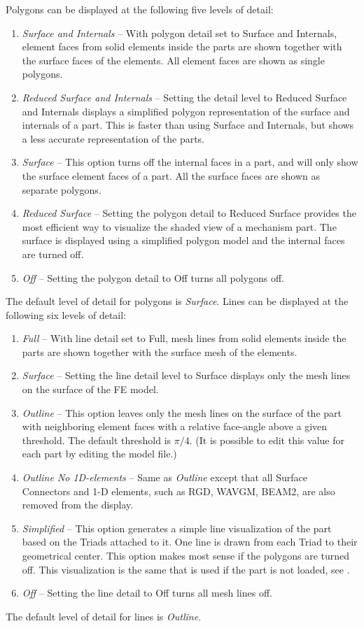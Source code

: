 Polygons can be displayed at the following five levels of detail:
%
\begin{enumerate}
\item{\sl Surface and Internals} --
  With polygon detail set to Surface and Internals,
  element faces from solid elements inside the parts are shown
  together with the surface faces of the elements.
  All element faces are shown as single polygons.
\item{\sl Reduced Surface and Internals} --
  Setting the detail level to Reduced Surface and Internals displays
  a simplified polygon representation of the surface and internals of a part.
  This is faster than using Surface and Internals,
  but shows a less accurate representation of the parts.
\item{\sl Surface} --
  This option turns off the internal faces in a part,
  and will only show the surface element faces of a part.
  All the surface faces are shown as separate polygons.
\item{\sl Reduced Surface} --
  Setting the polygon detail to Reduced Surface provides the most efficient way
  to visualize the shaded view of a mechanism part.
  The surface is displayed using a simplified polygon model
  and the internal faces are turned off.
\item{\sl Off} --
  Setting the polygon detail to Off turns all polygons off.
\end{enumerate}
%
The default level of detail for polygons is {\sl Surface}. \newline
Lines can be displayed at the following six levels of detail:
%
\begin{enumerate}
\item{\sl Full} --
  With line detail set to Full, mesh lines from solid elements inside the parts
  are shown together with the surface mesh of the elements.
\item{\sl Surface} --
  Setting the line detail level to Surface displays only the mesh lines
  on the surface of the FE model.
\item{\sl Outline} --
  This option leaves only the mesh lines on the surface of the part with
  neighboring element faces with a relative face-angle above a given threshold.
  The default threshold is $\pi/4$. (It is possible to edit this
  value for each part by editing the model file.)
\item{\sl Outline No 1D-elements} --
  Same as {\sl Outline} except that all Surface Connectors and 1-D elements,
  such as RGD, WAVGM, BEAM2, are also removed from the display.
\item{\sl Simplified} --
  This option generates a simple line visualization of the part
  based on the Triads attached to it.
  One line is drawn from each Triad to their geometrical center.
  This option makes most sense if the polygons are turned off.
  This visualization is the same that is used if the part is not loaded,
  see .
\item{\sl Off} --
  Setting the line detail to Off turns all mesh lines off.
\end{enumerate}
%
The default level of detail for lines is {\sl Outline}.

